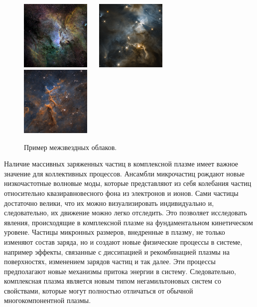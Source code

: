 \begin{figure}[htbp]
\begin{center}
\includegraphics[width=0.3\textwidth]{Ris/8.jpg} ~~ \includegraphics[width=0.3\textwidth]{Ris/6.png} ~~ \includegraphics[width=0.3\textwidth]{Ris/7.jpg}
\caption{Пример межзвездных облаков.}
\label{NonRec}
\end{center}
\end{figure}


Наличие массивных заряженных частиц в комплексной плазме имеет
важное значение для коллективных процессов. Ансамбли микрочастиц рождают
новые низкочастотные волновые моды, которые представляют из себя
колебания частиц относительно квазиравновесного фона из электронов
и ионов. Сами частицы достаточно велики, что их можно визуализировать
индивидуально и, следовательно, их движение можно легко отследить. Это
позволяет исследовать явления, происходящие в комплексной плазме на фундаментальном
кинетическом уровене. Частицы микронных размеров, внедренные
в плазму, не только изменяют состав заряда, но и создают новые
физические процессы в системе, например эффекты, связанные с диссипацией
и рекомбинацией плазмы на поверхностях, изменением зарядов частиц и так далее. Эти процессы предполагают новые механизмы притока энергии в систему.
Следовательно, комплексная плазма является новым типом негамильтоновых
систем со свойствами, которые могут полностью отличаться от обычной
многокомпонентной плазмы.

